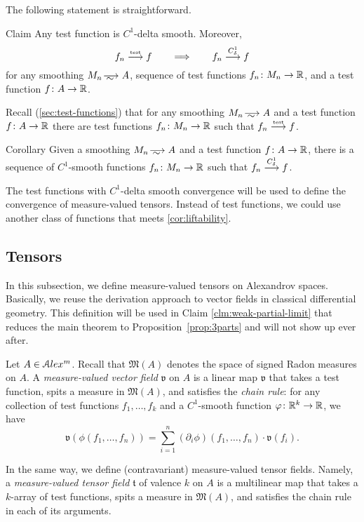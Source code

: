 The following statement is straightforward.

\begin{thm}{Claim}\label{clm:test=>smooth}
Any test function is $C^1$-delta smooth.
Moreover, 
\[f_n\stackrel{\text{\tiny\rm test}}{\longrightarrow} f
\qquad\Longrightarrow\qquad
f_n\stackrel{C^1_\delta}{\longrightarrow} f\]
for any smoothing $M_n\smooths{} A$,
sequence of test functions $f_n\:M_n\zz\to\RR$,
and a test function $f\:A\zz\to\RR$.
\end{thm}

Recall (\ref{sec:test-functions}) that for any smoothing $M_n\smooths{} A$ and a test function $f\colon A\to\mathbb{R}$ there are test functions  $f_n\colon M_n\to \mathbb{R}$ such that $f_n\stackrel{\text{\tiny\rm test}}{\longrightarrow} f$.

\begin{thm}{Corollary}\label{cor:liftability}
Given a smoothing $M_n\smooths{} A$ and a test function $f\colon A\to\mathbb{R}$,
there is a sequence of $C^1$-smooth functions $f_n\colon M_n\to \mathbb{R}$ such that $f_n\stackrel{C^1_\delta}{\longrightarrow} f$.
\end{thm}

The test functions with $C^1$-delta smooth convergence will be used to define the convergence of measure-valued tensors.
Instead of test functions, we could use another class of functions that meets \ref{cor:liftability}.

 
\subsection{Tensors}\label{subsec:tensors}

In this subsection, we define measure-valued tensors on Alexandrov spaces.
Basically, we reuse the derivation approach to vector fields in classical differential geometry.
This definition will be used in Claim \ref{clm:weak-partial-limit} that reduces the main theorem to Proposition~\ref{prop:3parts} and will not show up ever after.

Let $A\in \mathcal{A}lex^m$.
Recall that $\mathfrak M(A)$
denotes the space of signed Radon measures on $A$.
A \emph{measure-valued vector field} $\mathfrak{v}$  on $A$
is a linear map
$\mathfrak{v}$ that takes a test function,
spits a measure in $\mathfrak M(A)$,
and satisfies the \emph{chain rule}:
for any collection of test functions $f_1,\dots,f_k$
and a $C^1$-smooth function $\varphi\colon\mathbb{R}^k\to\mathbb{R}$, we have
$$\mathfrak{v}(\phi(f_1,\dots,f_n))
=
\sum_{i=1}^n (\partial_i\phi)(f_1,\dots,f_n)\cdot\mathfrak{v}(f_i).
$$

In the same way, we define (contravariant) measure-valued tensor fields.
Namely, a \emph{measure-valued tensor field} $\mathfrak{t}$ of valence $k$ on $A$ is a multilinear map that takes a $k$-array of test  functions, spits a measure in $\mathfrak M(A)$, and satisfies the chain rule in each of its arguments.

